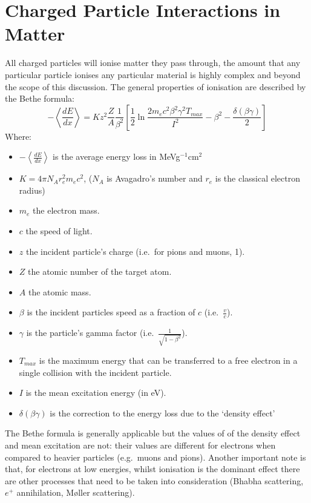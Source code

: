\section{Charged Particle Interactions in Matter} %
\label{sec:charged_particle_interactions_in_matter}
All charged particles will ionise matter they pass through, the amount that any particular particle ionises any particular material is highly complex and beyond the scope of this discussion. The general properties of ionisation are described by the Bethe formula:
\begin{equation}\label{eq:bethe_formaula}
  -\left\langle\frac{dE}{dx}\right\rangle = Kz^2\frac{Z}{A} \frac{1}{\beta^2}\left[\frac{1}{2}\ln\frac{2m_{e}c^{2}\beta^2\gamma^2T_{max}}{I^2} -\beta^2 - \frac{\delta(\beta\gamma)}{2}\right]
\end{equation}
Where:
\begin{itemize}
  \item \( -\left\langle\frac{dE}{dx}\right\rangle \) is the average energy loss in MeVg\(^{-1}\)cm\(^2\)
  \item \( K = 4\pi N_A r^2_e m_e c^2\), (\( N_A \) is Avagadro's number and \( r_e \) is the classical electron radius) 
  \item \( m_e \) the electron mass.
  \item \( c \) the speed of light.
  \item \( z \) the incident particle's charge (i.e.\ for pions and muons, 1).
  \item \( Z \) the atomic number of the target atom.
  \item \( A \) the atomic mass.
  \item \( \beta \) is the incident particles speed as a fraction of \( c \) (i.e.\ \( \frac{v}{c} \)).
  \item \( \gamma \) is the particle's gamma factor (i.e.\ \( \frac{1}{\sqrt{1-\beta^2}} \)).
  \item \( T_{max} \) is the maximum energy that can be transferred to a free electron in a single collision with the incident particle.
  \item \( I \) is the mean excitation energy (in eV).
  \item \( \delta(\beta\gamma) \) is the correction to the energy loss due to the `density effect'
\end{itemize}
The Bethe formula is generally applicable but the values of of the density effect and mean excitation are not: their values are different for electrons when compared to heavier particles (e.g.\ muons and pions). Another important note is that, for electrons at low energies, whilst ionisation is the dominant effect there are other processes that need to be taken into consideration (Bhabha scattering, \(e^+\) annihilation, M\o ller scattering). 

